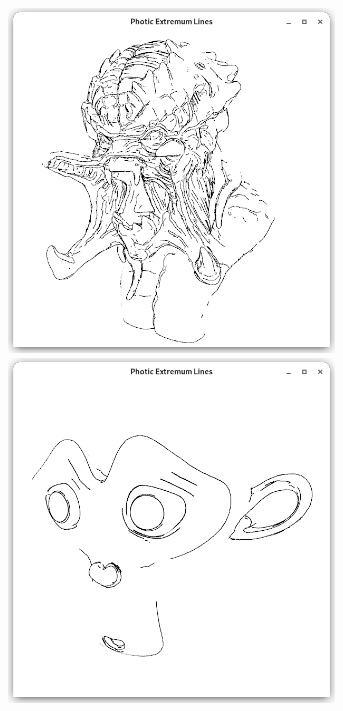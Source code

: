 \documentclass[9pt,fleqn,twoside,twocolumn]{stdglobal}
\begin{document}
\begin{figure}
\begin{subfigure}[t]{0.19\textwidth}
        \includegraphics[width=0.95\textwidth,trim={15px 15 15 50},clip]{images/results/predator-pel.png}
        \includegraphics[width=0.95\textwidth,trim={15px 15 15 50},clip]{images/results/suzanne-pel.png}

\end{subfigure}
\end{figure}
\end{document}
